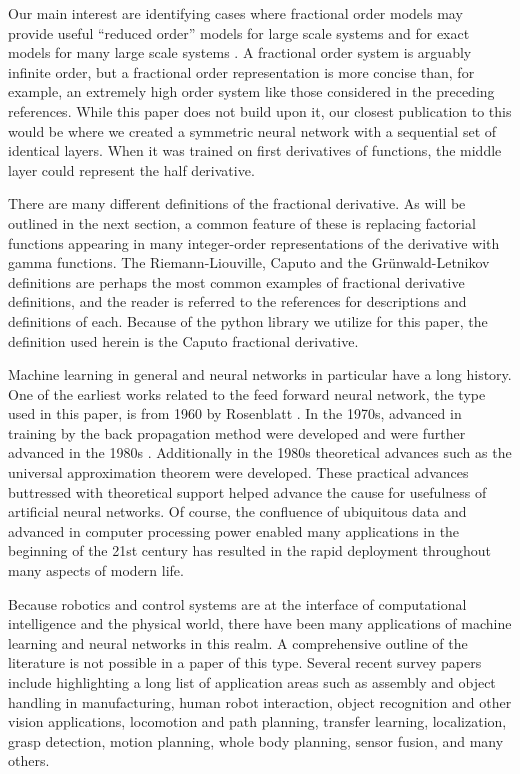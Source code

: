   Our main interest are identifying cases where fractional order models may
  provide useful ``reduced order'' models for large scale systems
  \cite{goodwinemed2023,goodwinemmar2023} and for exact models for many large
  scale systems
  \cite{Goodwine2014Modeling,Leyden2016Using,Leyden2019Large,bg:xnids2022,bg:xninonlinear2020}.
  A fractional order system is arguably infinite order, but a fractional order
  representation is more concise than, for example, an extremely high order
  system like those considered in the preceding references.  While this paper
  does not build upon it, our closest publication to this would be
  \cite{bg:chenSII2022} where we created a symmetric neural network with a
  sequential set of identical layers. When it was trained on first derivatives
  of functions, the middle layer could represent the half derivative. 
 
 There are many different definitions of the fractional derivative. As will be
 outlined in the next section, a common feature of these is replacing factorial
 functions appearing in many integer-order representations of the derivative
 with gamma functions. The Riemann-Liouville, Caputo and the Gr\"unwald-Letnikov
 definitions are perhaps the most common examples of fractional derivative
 definitions, and the reader is referred to the references
 \cite{Machado20111140,4609961,series/lnee/Ortigueira11,das2011functional} for
 descriptions and definitions of each. Because of the python library we utilize
 for this paper, the definition used herein is the Caputo fractional derivative. 

 Machine learning in general and neural networks in particular have a long
 history. One of the earliest works related to the feed forward neural network,
 the type used in this paper, is from 1960 by Rosenblatt \cite{Rosenblatt1960}.
 In the 1970s, advanced in training by the back propagation method were
 developed \cite{linnainmaa1} and were further advanced in the 1980s
 \cite{werbos}.  Additionally in the 1980s theoretical advances such as the
 universal approximation theorem \cite{hornik1989multilayer} were developed.
 These practical advances buttressed with theoretical support helped advance the
 cause for usefulness of artificial neural networks. Of course, the confluence
 of ubiquitous data and advanced in computer processing power enabled many
 applications in the beginning of the 21st century has resulted in the rapid
 deployment throughout many aspects of modern life. 

 Because robotics and control systems are at the interface of computational
 intelligence and the physical world, there have been many applications of
 machine learning and neural networks in this realm. A comprehensive outline of
 the literature is not possible in a paper of this type. Several recent survey
 papers include \cite{semeraro,9199280,bai} highlighting a long list of
 application areas such as assembly and object handling in manufacturing, human
 robot interaction, object recognition and other vision applications, locomotion
 and path planning, transfer learning, localization, grasp detection, motion
 planning, whole body planning, sensor fusion, and many others.
 


